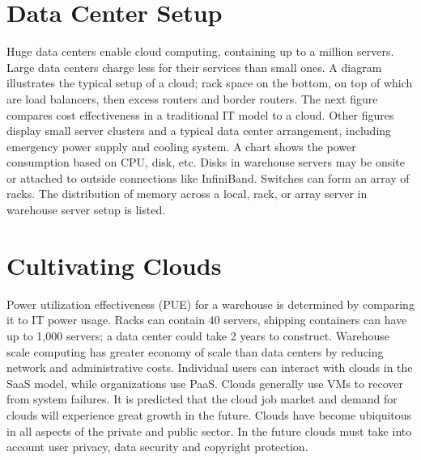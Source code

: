 

\section{Data Center Setup}

Huge data centers enable cloud computing, containing up to a million
servers. Large data centers charge less for their services than small
ones. A diagram illustrates the typical setup of a cloud; rack space on
the bottom, on top of which are load balancers, then excess routers and
border routers. The next figure compares cost effectiveness in a
traditional IT model to a cloud. Other figures display small server
clusters and a typical data center arrangement, including emergency
power supply and cooling system. A chart shows the power consumption
based on CPU, disk, etc. Disks in warehouse servers may be onsite or
attached to outside connections like InfiniBand. Switches can form an
array of racks. The distribution of memory across a local, rack, or
array server in warehouse server setup is listed.



\section{Cultivating Clouds}

Power utilization effectiveness (PUE) for a warehouse is determined by
comparing it to IT power usage. Racks can contain 40 servers, shipping
containers can have up to 1,000 servers; a data center could take 2
years to construct. Warehouse scale computing has greater economy of
scale than data centers by reducing network and administrative costs.
Individual users can interact with clouds in the SaaS model, while
organizations use PaaS. Clouds generally use VMs to recover from system
failures. It is predicted that the cloud job market and demand for
clouds will experience great growth in the future. Clouds have become
ubiquitous in all aspects of the private and public sector. In the
future clouds must take into account user privacy, data security and
copyright protection.




